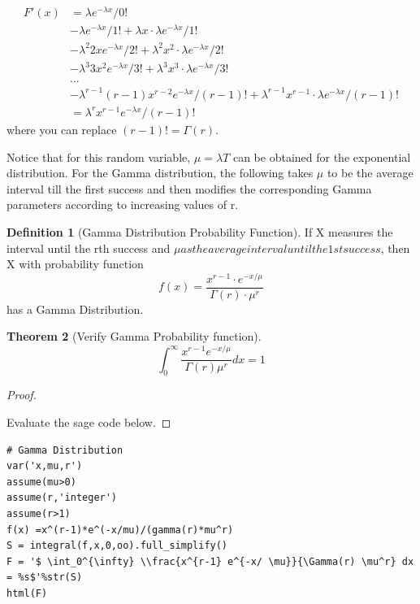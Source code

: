 \documentclass[10pt,]{book}
\theoremstyle{plain}
\newtheorem{theorem}{Theorem}[section]
\theoremstyle{definition}
\newtheorem{definition}[theorem]{Definition}
\theoremstyle{definition}
\theoremstyle{definition}
\numberwithin{equation}{section}
\begin{document}
\begin{align*}
F'(x) & = \lambda e^{-\lambda x}/0!\\
 & - \lambda e^{-\lambda x}/1! + \lambda x \cdot \lambda e^{-\lambda x}/1!\\
 & - \lambda^2 2x e^{-\lambda x}/2! + \lambda^2 x^2 \cdot \lambda e^{-\lambda x}/2!\\
 & - \lambda^3 3x^2 e^{-\lambda x}/3! + \lambda^3 x^3 \cdot \lambda e^{-\lambda x}/3!\\
 & . . .\\
 & - \lambda^{r-1} (r-1)x^{r-2} e^{-\lambda x}/(r-1)! + \lambda^{r-1} x^{r-1} \cdot \lambda e^{-\lambda x}/(r-1)!\\
 & = \lambda^r x^{r-1} e^{-\lambda x}/(r-1)!
\end{align*}
where you can replace \((r-1)! = \Gamma(r)\).
%
\par

Notice that for this random variable, \(\mu = \lambda T\) can be obtained for the exponential distribution. For the Gamma distribution, the following takes \(\mu\) to be the average interval till the first success and then modifies the corresponding Gamma parameters according to increasing values of r.
%
\par

\begin{definition}[{Gamma Distribution Probability Function}]\label{definition-31}
If X measures the interval until the rth success and \(\mu as the average interval until the 1st success\), then X with probability function
\begin{equation*}f(x) =  \frac{x^{r-1} \cdot e^{-x / \mu}}{\Gamma(r) \cdot \mu^r}\end{equation*}
has a Gamma Distribution.
\end{definition}


\begin{theorem}[{Verify Gamma Probability function}]\label{theorem-53}
\begin{equation*}\int_0^{\infty} \frac{x^{r-1} e^{-x/ \mu}}{\Gamma(r) \mu^r} dx = 1\end{equation*}\end{theorem}
\begin{proof}\hypertarget{proof-52}{}

Evaluate the sage code below.
%
\end{proof}


\begin{lstlisting}[style=sageinput]
# Gamma Distribution
var('x,mu,r')
assume(mu>0)
assume(r,'integer')
assume(r>1)
f(x) =x^(r-1)*e^(-x/mu)/(gamma(r)*mu^r)
S = integral(f,x,0,oo).full_simplify()
F = '$ \int_0^{\infty} \\frac{x^{r-1} e^{-x/ \mu}}{\Gamma(r) \mu^r} dx = %s$'%str(S)
html(F)
\end{lstlisting}
\end{document}
